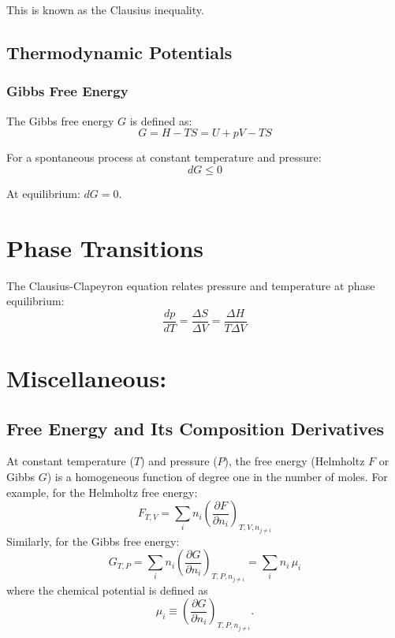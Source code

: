 \documentclass{article}
\theoremstyle{definition}
\begin{document}
This is known as the Clausius inequality.

\subsection{Thermodynamic Potentials}

\subsubsection{Gibbs Free Energy}

The Gibbs free energy $G$ is defined as:
\begin{equation}
G = H - TS = U + pV - TS
\end{equation}

For a spontaneous process at constant temperature and pressure:
\begin{equation}
dG \leq 0
\end{equation}

At equilibrium: $dG = 0$.

\section{Phase Transitions}

The Clausius-Clapeyron equation relates pressure and temperature at phase equilibrium:
\begin{equation}
\frac{dp}{dT} = \frac{\Delta S}{\Delta V} = \frac{\Delta H}{T \Delta V}
\end{equation}

\section{Miscellaneous:}

\subsection{Free Energy and Its Composition Derivatives}
At constant temperature (\(T\)) and pressure (\(P\)), the free energy (Helmholtz \(F\) or Gibbs \(G\)) is a homogeneous function of degree one in the number of moles. For example, for the Helmholtz free energy:
\begin{equation}
F_{T,V} = \sum_i n_i \left(\frac{\partial F}{\partial n_i}\right)_{T,V,n_{j\neq i}}
\end{equation}
Similarly, for the Gibbs free energy:
\begin{equation}
G_{T,P} = \sum_i n_i \left(\frac{\partial G}{\partial n_i}\right)_{T,P,n_{j\neq i}} = \sum_i n_i\,\mu_i
\end{equation}
where the chemical potential is defined as
\begin{equation}
\mu_i \equiv \left(\frac{\partial G}{\partial n_i}\right)_{T,P,n_{j\neq i}}.
\end{equation}
\end{document}
